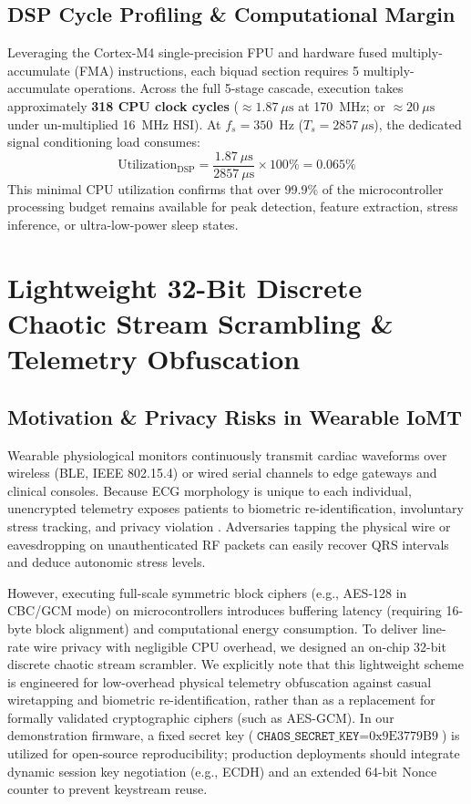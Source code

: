 \documentclass[conference]{IEEEtran}
\begin{document}
\subsection{DSP Cycle Profiling \& Computational Margin}
Leveraging the Cortex-M4 single-precision FPU and hardware fused multiply-accumulate (FMA) instructions, each biquad section requires 5 multiply-accumulate operations. Across the full 5-stage cascade, execution takes approximately \textbf{318 CPU clock cycles} ($\approx 1.87~\mu\text{s}$ at 170~MHz; or $\approx 20~\mu\text{s}$ under un-multiplied 16~MHz HSI). At $f_s = 350$~Hz ($T_s = 2857~\mu\text{s}$), the dedicated signal conditioning load consumes:
\begin{equation}
    \text{Utilization}_{\text{DSP}} = \frac{1.87~\mu\text{s}}{2857~\mu\text{s}} \times 100\% = 0.065\%
\end{equation}
This minimal CPU utilization confirms that over 99.9\% of the microcontroller processing budget remains available for peak detection, feature extraction, stress inference, or ultra-low-power sleep states.

\section{Lightweight 32-Bit Discrete Chaotic Stream Scrambling \& Telemetry Obfuscation}
\label{sec:chaos_scrambler}

\subsection{Motivation \& Privacy Risks in Wearable IoMT}
Wearable physiological monitors continuously transmit cardiac waveforms over wireless (BLE, IEEE 802.15.4) or wired serial channels to edge gateways and clinical consoles. Because ECG morphology is unique to each individual, unencrypted telemetry exposes patients to biometric re-identification, involuntary stress tracking, and privacy violation \cite{alturjman2020iomt}. Adversaries tapping the physical wire or eavesdropping on unauthenticated RF packets can easily recover QRS intervals and deduce autonomic stress levels.

However, executing full-scale symmetric block ciphers (e.g., AES-128 in CBC/GCM mode) on microcontrollers introduces buffering latency (requiring 16-byte block alignment) and computational energy consumption. To deliver line-rate wire privacy with negligible CPU overhead, we designed an on-chip 32-bit discrete chaotic stream scrambler. We explicitly note that this lightweight scheme is engineered for low-overhead physical telemetry obfuscation against casual wiretapping and biometric re-identification, rather than as a replacement for formally validated cryptographic ciphers (such as AES-GCM). In our demonstration firmware, a fixed secret key ($\texttt{CHAOS\_SECRET\_KEY} = \text{0x9E3779B9}$) is utilized for open-source reproducibility; production deployments should integrate dynamic session key negotiation (e.g., ECDH) and an extended 64-bit Nonce counter to prevent keystream reuse.
\end{document}
